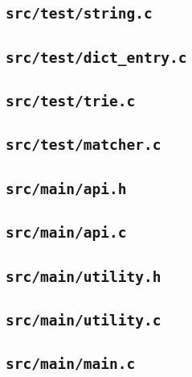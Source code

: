 \documentclass[../main.tex]{subfiles}
\begin{document}
\subsection{\texttt{src/test/string.c}}


\subsection{\texttt{src/test/dict\_entry.c}}


\subsection{\texttt{src/test/trie.c}}


\subsection{\texttt{src/test/matcher.c}}


\subsection{\texttt{src/main/api.h}}


\subsection{\texttt{src/main/api.c}}


\subsection{\texttt{src/main/utility.h}}


\subsection{\texttt{src/main/utility.c}}


\subsection{\texttt{src/main/main.c}}

\end{document}
